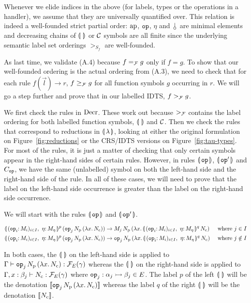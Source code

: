 Whenever we elide indices in the above (for labels, types or the operations
in a handler), we assume that they are universally quantified over. This
relation is indeed a well-founded strict partial order: $\operatorname{ap}$, $\mathtt{op}$,
$\eta$ and $\cherry$ are minimal elements and decreasing chains of
$\llparenthesis \,  \, \rrparenthesis$ or $\mathcal{C}$ symbols are all finite since the underlying semantic
label set orderings $>_{S_f}$ are well-founded.

As last time, we validate (A.4) because $f =_{\mathcal{F}} g$ only if $f = g$. To
show that our well-founded ordering is the actual ordering from (A.3), we
need to check that for each rule $f(\vec{l}) \to r$, $f \ge_{\mathcal{F}} g$ for all
function symbols $g$ occurring in $r$. We will go a step further and prove
that in our labelled IDTS, $f >_{\mathcal{F}} g$.

We first check the rules in $\mathrm{Decr}$. These work out because $>_{\mathcal{F}}$
contains the label ordering for both labelled function symbols, $\llparenthesis \,  \, \rrparenthesis$
and $\mathcal{C}$. Then we check the rules that correspond to reductions in
$\llparenthesis \, \lambda \, \rrparenthesis$, looking at either the original formulation on
Figure~\ref{fig:reductions} or the CRS/IDTS versions on
Figure~\ref{fig:tau-types}. For most of the rules, it is just a matter of
checking that only certain symbols appear in the right-hand sides of
certain rules. However, in rules $\llparenthesis \, \mathtt{op} \, \rrparenthesis$, $\llparenthesis \, \mathtt{op}' \, \rrparenthesis$
and $C_{\mathtt{op}}$, we have the same (unlabelled) symbol on both the
left-hand side and the right-hand side of the rule. In all of these cases,
we will need to prove that the label on the left-hand side occurrence is
greater than the label on the right-hand side occurrence.

We will start with the rules $\llparenthesis \, \mathtt{op} \, \rrparenthesis$ and $\llparenthesis \, \mathtt{op}' \, \rrparenthesis$.

\begin{align*}
  \ap{\cibanana^p}{(\ap{\ap{\op{op}_j}{N_{\mathrm{p}}}}{(\lam{x}{N_{\mathrm{c}}})})}
  & \to \ap{M_j}{\ap{N_{\mathrm{p}}}{(\lam{x}{\ap{\cibanana^q}{N_{\mathrm{c}}}})}}
  & \text{ where $j \in I$} \\
  \ap{\cibanana^p}{(\ap{\ap{\op{op}_j}{N_{\mathrm{p}}}}{(\lam{x}{N_{\mathrm{c}}})})}
  &\to \ap{\op{op}_j}{\ap{N_{\mathrm{p}}}{(\lam{x}{\ap{\cibanana^q}{N_{\mathrm{c}}}})}}
  & \text{ where $j \notin I$}
\end{align*}

In both cases, the $\llparenthesis \,  \, \rrparenthesis$ on the left-hand side is applied to
$\Gamma \vdash \mathtt{op}_j\,N_{\mathrm{p}}\,(\lambda x.\, N_{\mathrm{c}}) :
\mathcal{F}_E(\gamma)$ whereas the $\llparenthesis \,  \, \rrparenthesis$ on the right-hand side is applied to
$\Gamma, x : \beta_j \vdash N_{\mathrm{c}} : \mathcal{F}_E(\gamma)$ where
$\mathtt{op}_j : \alpha_j \rightarrowtail \beta_j \in E$. The label $p$ of the left
$\llparenthesis \,  \, \rrparenthesis$ will be the denotation
$\llbracket \mathtt{op}_j\,N_{\mathrm{p}}\,(\lambda x.\, N_{\mathrm{c}}) \rrbracket$ whereas the label
$q$ of the right $\llparenthesis \,  \, \rrparenthesis$ will be the denotation $\llbracket N_{\mathrm{c}} \rrbracket$.

